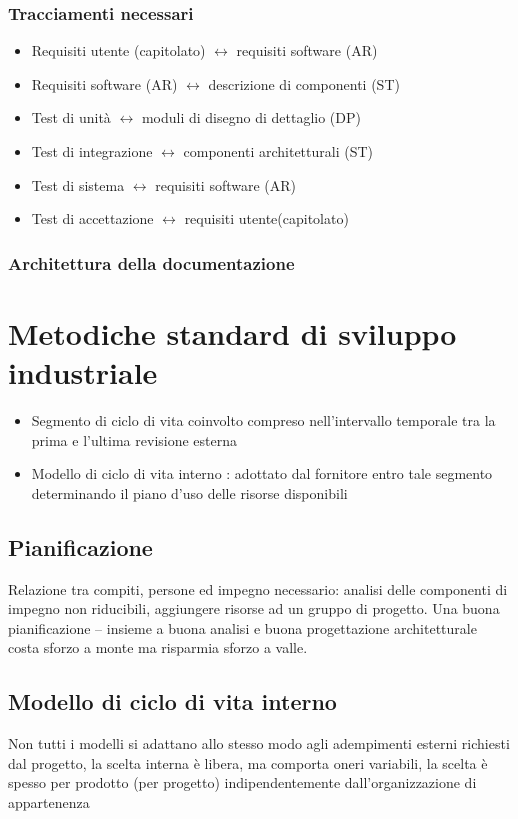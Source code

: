 \subsubsection{Tracciamenti necessari}
\begin{itemize}
\item Requisiti utente (capitolato) $\leftrightarrow$ requisiti software (AR)
\item Requisiti software (AR) $\leftrightarrow$ descrizione di componenti (ST) 
\item Test di unità $\leftrightarrow$ moduli di disegno di dettaglio (DP) 
\item Test di integrazione $\leftrightarrow$ componenti architetturali (ST) 
\item Test di sistema $\leftrightarrow$ requisiti software (AR) 
\item Test di accettazione $\leftrightarrow$ requisiti utente(capitolato)
\end{itemize}

\subsubsection{Architettura della documentazione}

\section{Metodiche standard di sviluppo industriale}
\begin{itemize}
\item Segmento di ciclo di vita coinvolto compreso nell'intervallo temporale tra la prima e l'ultima revisione esterna
\item Modello di ciclo di vita interno : adottato dal fornitore entro tale segmento determinando il piano d'uso delle risorse disponibili
\end{itemize}

\subsection{Pianificazione}
Relazione tra compiti, persone ed impegno necessario: analisi delle componenti di impegno non riducibili, aggiungere risorse ad un gruppo di progetto.
Una buona pianificazione – insieme a buona analisi e buona progettazione architetturale costa sforzo a monte ma risparmia sforzo a valle.
\subsection{Modello di ciclo di vita interno}
Non tutti i modelli si adattano allo stesso modo agli adempimenti esterni richiesti dal progetto, la scelta interna è libera, ma comporta oneri variabili, la scelta è spesso per prodotto (per progetto) indipendentemente dall'organizzazione di appartenenza
